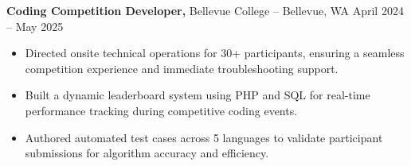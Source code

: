 \documentclass[11pt]{article}       %
\begin{document}

\textbf{Coding Competition Developer,} {Bellevue College} -- Bellevue, WA \hfill April 2024 -- May 2025 \\
\vspace{-9pt}
\begin{itemize}
  \item Directed onsite technical operations for 30+ participants, ensuring a seamless competition experience and immediate troubleshooting support.
  \item Built a dynamic leaderboard system using PHP and SQL for real-time performance tracking during competitive coding events.
  \item Authored automated test cases across 5 languages to validate participant submissions for algorithm accuracy and efficiency.
\end{itemize}

\end{document}

